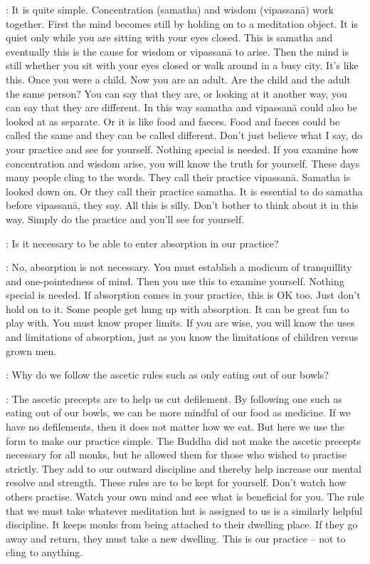 : It is quite simple. Concentration (samatha) and wisdom (vipassan\=a) work together. First the mind becomes still by holding on to a meditation object. It is quiet only while you are sitting with your eyes closed. This is samatha and eventually this  is the cause for wisdom or vipassan\=a to arise. Then the mind is still whether you sit with your eyes closed or walk around in a busy city. It's like this. Once you were a child. Now you are an adult. Are the child and the adult the same person? You can say that they are, or looking at it another way, you can say that they are different. In this way samatha and vipassan\=a could also be looked at as separate. Or it is like food and faeces. Food and faeces could be called the same and they can be called different. Don't just believe what I say, do your practice and see for yourself. Nothing special is needed. If you examine how concentration and wisdom arise, you will know the truth for yourself. These days many people cling to the words. They call their practice vipassan\=a. Samatha is looked down on. Or they call their practice samatha. It is essential to do samatha before vipassan\=a, they say. All this is silly. Don't bother to think about it in this way. Simply do the practice and you'll see for yourself. 

:
Is it necessary to be able to enter absorption in our practice? 

: No, absorption is not necessary. You must establish a modicum of tranquillity and one-pointedness of mind. Then you use this to examine yourself. Nothing special is needed. If absorption comes in your practice, this is OK too. Just don't hold on to it. Some people get hung up with absorption. It can be great fun to play with. You must know proper limits. If you are wise, you will know the uses and limitations of absorption, just as you know the limitations of children versus grown men. 

:
Why do we follow the ascetic rules such as only eating out of our bowls? 

: The ascetic precepts are to help us cut defilement. By following one such as eating out of our bowls, we can be more mindful of our food as medicine. If we have no defilements, then it does not matter how we eat. But here we use the form to make our practice simple. The Buddha did not make the ascetic precepts necessary for all monks, but he allowed them for those who wished to practise strictly. They add to our outward discipline and thereby help increase our mental resolve and strength. These rules are to be kept for yourself. Don't watch how others practise. Watch your own mind and see what is beneficial for you. The rule that we must take whatever meditation hut is assigned to us is a similarly helpful discipline. It keeps monks from being attached to their dwelling place. If they go away and return, they must take a new dwelling. This is our practice -- not to cling to anything. 


